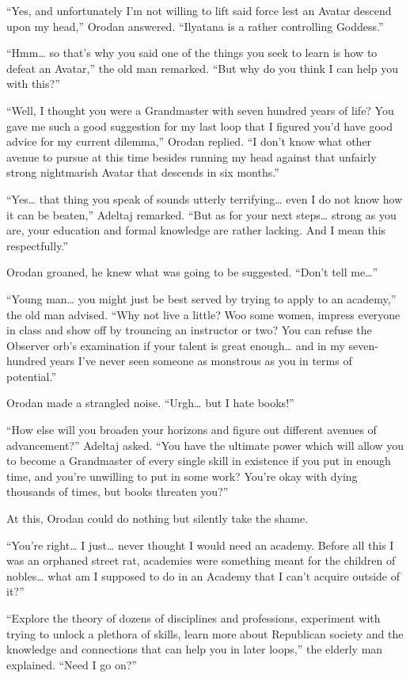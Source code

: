 \documentclass[a4paper,10pt]{book}
\begin{document}
“Yes, and unfortunately I’m not willing to lift said force lest an Avatar descend upon my head,” Orodan answered. “Ilyatana is a rather controlling Goddess.”\par
“Hmm… so that’s why you said one of the things you seek to learn is how to defeat an Avatar,” the old man remarked. “But why do you think I can help you with this?”\par
“Well, I thought you were a Grandmaster with seven hundred years of life? You gave me such a good suggestion for my last loop that I figured you’d have good advice for my current dilemma,” Orodan replied. “I don’t know what other avenue to pursue at this time besides running my head against that unfairly strong nightmarish Avatar that descends in six months.”\par
“Yes… that thing you speak of sounds utterly terrifying… even I do not know how it can be beaten,” Adeltaj remarked. “But as for your next steps… strong as you are, your education and formal knowledge are rather lacking. And I mean this respectfully.”\par
Orodan groaned, he knew what was going to be suggested. “Don’t tell me…”\par
“Young man… you might just be best served by trying to apply to an academy,” the old man advised. “Why not live a little? Woo some women, impress everyone in class and show off by trouncing an instructor or two? You can refuse the Observer orb’s examination if your talent is great enough… and in my seven-hundred years I’ve never seen someone as monstrous as you in terms of potential.”\par
Orodan made a strangled noise. “Urgh… but I hate books!”\par
“How else will you broaden your horizons and figure out different avenues of advancement?” Adeltaj asked. “You have the ultimate power which will allow you to become a Grandmaster of every single skill in existence if you put in enough time, and you’re unwilling to put in some work? You’re okay with dying thousands of times, but books threaten you?”\par
At this, Orodan could do nothing but silently take the shame.\par
“You’re right… I just… never thought I would need an academy. Before all this I was an orphaned street rat, academies were something meant for the children of nobles… what am I supposed to do in an Academy that I can’t acquire outside of it?”\par
“Explore the theory of dozens of disciplines and professions, experiment with trying to unlock a plethora of skills, learn more about Republican society and the knowledge and connections that can help you in later loops,” the elderly man explained. “Need I go on?”\par
\end{document}
